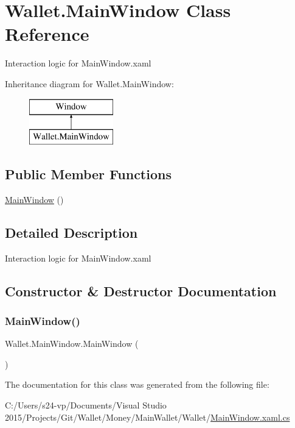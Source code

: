 \hypertarget{class_wallet_1_1_main_window}{}\section{Wallet.\+Main\+Window Class Reference}
\label{class_wallet_1_1_main_window}


Interaction logic for Main\+Window.\+xaml  


Inheritance diagram for Wallet.\+Main\+Window\+:\begin{figure}[H]
\begin{center}
\leavevmode
\includegraphics[height=2.000000cm]{class_wallet_1_1_main_window}
\end{center}
\end{figure}
\subsection*{Public Member Functions}
\begin{DoxyCompactItemize}
\item 
\hyperlink{class_wallet_1_1_main_window_ab32a084214f9d65943bb8a5fffdfd425}{Main\+Window} ()
\end{DoxyCompactItemize}


\subsection{Detailed Description}
Interaction logic for Main\+Window.\+xaml 



\subsection{Constructor \& Destructor Documentation}
\hypertarget{class_wallet_1_1_main_window_ab32a084214f9d65943bb8a5fffdfd425}{}\label{class_wallet_1_1_main_window_ab32a084214f9d65943bb8a5fffdfd425} 
\subsubsection{\texorpdfstring{Main\+Window()}{MainWindow()}}
{\footnotesize\ttfamily Wallet.\+Main\+Window.\+Main\+Window (\begin{DoxyParamCaption}{ }\end{DoxyParamCaption})}



The documentation for this class was generated from the following file\+:\begin{DoxyCompactItemize}
\item 
C\+:/\+Users/s24-\/vp/\+Documents/\+Visual Studio 2015/\+Projects/\+Git/\+Wallet/\+Money/\+Main\+Wallet/\+Wallet/\hyperlink{_main_window_8xaml_8cs}{Main\+Window.\+xaml.\+cs}\end{DoxyCompactItemize}
